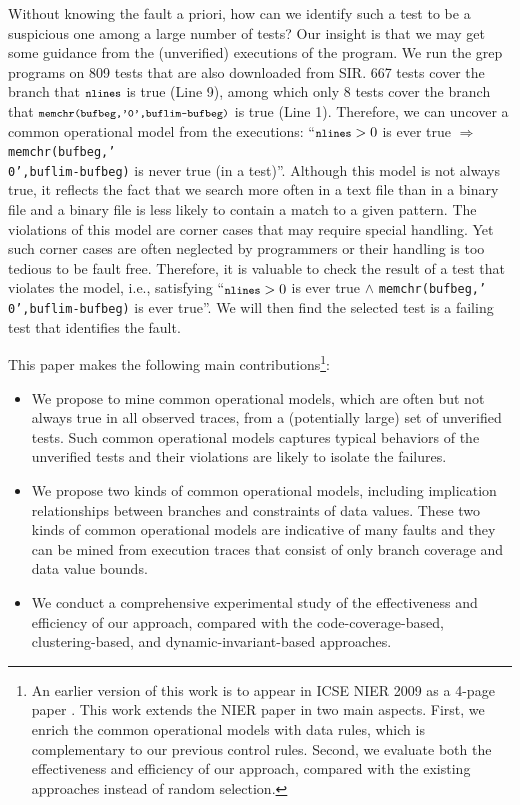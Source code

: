 \documentclass{sig-alternate}
\newcommand{\CodeIn}[1]{{\small\texttt{#1}}}
\begin{document}
Without knowing the fault a priori, how can we identify such a test
to be a suspicious one among a large number of tests? Our insight is
that we may get some guidance from the (unverified) executions of
the program. We run the grep programs on 809 tests that are also
downloaded from SIR. 667 tests cover the branch that
$\CodeIn{nlines}$ is true (Line 9), among which only 8 tests cover
the branch that $\CodeIn{memchr(bufbeg,'\\0',buflim-bufbeg)}$ is
true (Line 1). Therefore, we can uncover a common operational model
from the executions: ``$\CodeIn{nlines}>0$ is ever true
$\Rightarrow$ \CodeIn{memchr(bufbeg,'\\0',buflim-bufbeg)} is never
true (in a test)''. Although this model is not always true, it
reflects the fact that we search more often in a text file than in a
binary file and a binary file is less likely to contain a match to a
given pattern. The violations of this model are corner cases that
may require special handling. Yet such corner cases are often
neglected by programmers or their handling is too tedious to be
fault free. Therefore, it is valuable to check the result of a test
that violates the model, i.e., satisfying ``$\CodeIn{nlines}>0$ is
ever true $\wedge$ \CodeIn{memchr(bufbeg,'\\0',buflim-bufbeg)} is
ever true''. We will then find the selected test is a failing test
that identifies the fault.


This paper makes the following main contributions\footnote{An
earlier version of this work is to appear in ICSE NIER 2009 as a
4-page paper \cite{Zheng09}. This work extends the NIER paper in two
main aspects. First, we enrich the common operational models with
data rules, which is complementary to our previous control rules.
Second, we evaluate both the effectiveness and efficiency of our
approach, compared with the existing approaches instead of random
selection.}:



\begin{itemize}
\item
We propose to mine common operational models, which are often but
not always true in all observed traces, from a (potentially large)
set of unverified tests. Such common operational models captures
typical behaviors of the unverified tests and their violations are
likely to isolate the failures.


\item
We propose two kinds of common operational models, including
implication relationships between branches and constraints of data
values. These two kinds of common operational models are indicative
of many faults and they can be mined from execution traces that
consist of only branch coverage and data value bounds.


\item

We conduct a comprehensive experimental study of the effectiveness
and efficiency of our approach, compared with the
code-coverage-based, clustering-based, and dynamic-invariant-based
approaches.


\end{itemize}
\end{document}
